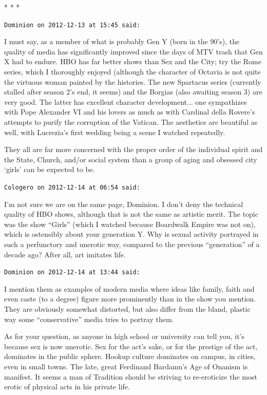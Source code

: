 
\begin{center}* * *\end{center}

\begin{footnotesize}
\begin{sffamily}
\texttt{Dominion on 2012-12-13 at 15:45 said:}

I must say, as a member of what is probably Gen Y (born in the 90's), the quality of media has significantly improved since the days of MTV trash that Gen X had to endure. HBO has far better shows than Sex and the City; try the Rome series, which I thoroughly enjoyed (although the character of Octavia is not quite the virtuous woman painted by the histories. The new Spartacus series (currently stalled after season 2's end, it seems) and the Borgias (also awaiting season 3) are very good. The latter has excellent character development... one sympathizes with Pope Alexander VI and his lovers as much as with Cardinal della Rovere's attempts to purify the corruption of the Vatican. The aesthetics are beautiful as well, with Lucrezia's first wedding being a scene I watched repeatedly.

They all are far more concerned with the proper order of the individual spirit and the State, Church, and/or social system than a group of aging and obsessed city `girls' can be expected to be.

\hfill

\texttt{Cologero on 2012-12-14 at 06:54 said:}

I'm not sure we are on the same page, Dominion. I don't deny the technical quality of HBO shows, although that is not the same as artistic merit. The topic was the show ``Girls'' (which I watched because Boardwalk Empire was not on), which is ostensibly about your generation Y. Why is sexual activity portrayed in such a perfunctory and unerotic way, compared to the previous ``generation'' of a decade ago? After all, art imitates life.

\hfill

\texttt{Dominion on 2012-12-14 at 13:44 said:}

I mention them as examples of modern media where ideas like family, faith and even caste (to a degree) figure more prominently than in the show you mention. They are obviously somewhat distorted, but also differ from the bland, plastic way some ``conservative'' media tries to portray them.

As for your question, as anyone in high school or university can tell you, it's because sex is now unerotic. Sex for the act's sake, or for the prestige of the act, dominates in the public sphere. Hookup culture dominates on campus, in cities, even in small towns. The late, great Ferdinand Bardamu's Age of Onanism is manifest. It seems a man of Tradition should be striving to re-eroticize the most erotic of physical acts in his private life.


\end{sffamily}
\end{footnotesize}
